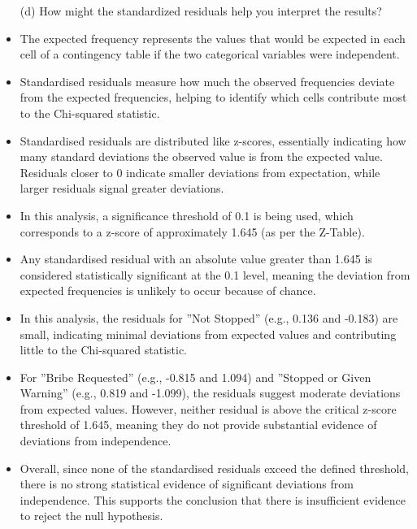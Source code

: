 \documentclass[12pt,letterpaper]{article}
\begin{document}
\newpage
\begin{enumerate}
	\item [(d)] How might the standardized residuals help you interpret the results?  	
\end{enumerate}

\begin{itemize}
	\item 
	The expected frequency represents the values that would be expected in each cell of a contingency table if the two categorical variables were independent. 
	\item
	Standardised residuals measure how much the observed frequencies deviate from the expected frequencies, helping to identify which cells contribute most to the Chi-squared statistic.
	\item 
	Standardised residuals are distributed like z-scores, essentially indicating how many standard deviations the observed value is from the expected value. Residuals closer to 0 indicate smaller deviations from expectation, while larger residuals signal greater deviations.
	\item 
	In this analysis, a significance threshold of 0.1 is being used, which corresponds to a z-score of approximately 1.645 (as per the Z-Table). 
	\item 
	Any standardised residual with an absolute value greater than 1.645 is considered statistically significant at the 0.1 level, meaning the deviation from expected frequencies is unlikely to occur because of chance.
	\item 
	In this analysis, the residuals for ”Not Stopped” (e.g., 0.136 and -0.183) are small, indicating minimal deviations from expected values and contributing little to the Chi-squared statistic.
	\item 
	For ”Bribe Requested” (e.g., -0.815 and 1.094) and ”Stopped or Given Warning” (e.g., 0.819 and -1.099), the residuals suggest moderate deviations from expected values. However, neither residual is above the critical z-score threshold of 1.645, meaning they do not provide substantial evidence of deviations from independence. 
	\item 
	Overall, since none of the standardised residuals exceed the defined threshold, there is no strong statistical evidence of significant deviations from independence. This supports the conclusion that there is insufficient evidence to reject the null hypothesis.
\end{itemize}

\newpage
\end{document}
